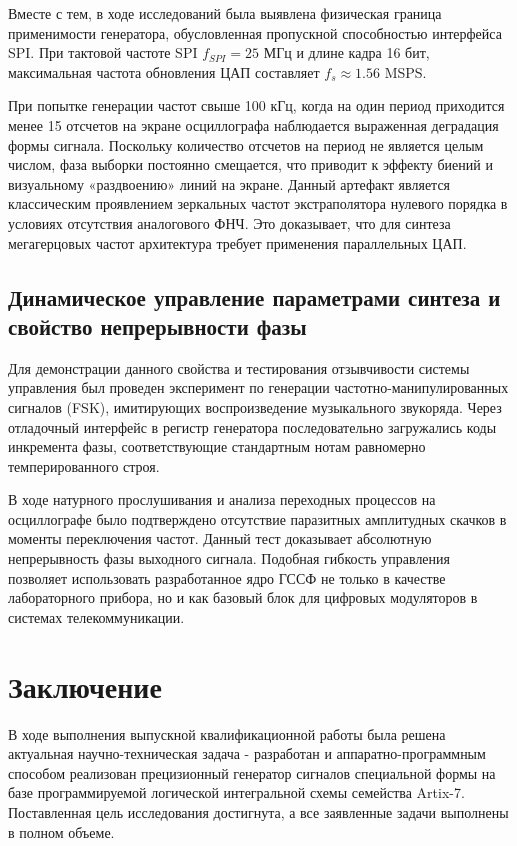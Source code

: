 \documentclass[12pt,a4paper,TimesNewRoman]{article}
\begin{document}
Вместе с тем, в ходе исследований была выявлена физическая граница применимости генератора, обусловленная пропускной способностью интерфейса SPI. При тактовой частоте SPI $f_{SPI} = 25$ МГц и длине кадра 16 бит, максимальная частота обновления ЦАП составляет $f_s \approx 1.56$ MSPS.

При попытке генерации частот свыше 100 кГц, когда на один период приходится менее 15 отсчетов на экране осциллографа наблюдается выраженная деградация формы сигнала. Поскольку количество отсчетов на период не является целым числом, фаза выборки постоянно смещается, что приводит к эффекту биений и визуальному «раздвоению» линий на экране. Данный артефакт является классическим проявлением зеркальных частот экстраполятора нулевого порядка в условиях отсутствия аналогового ФНЧ. Это доказывает, что для синтеза мегагерцовых частот архитектура требует применения параллельных ЦАП.

\subsection{Динамическое управление параметрами синтеза и свойство непрерывности фазы}

Для демонстрации данного свойства и тестирования отзывчивости системы управления был проведен эксперимент по генерации частотно-манипулированных сигналов (FSK), имитирующих воспроизведение музыкального звукоряда. Через отладочный интерфейс в регистр генератора последовательно загружались коды инкремента фазы, соответствующие стандартным нотам равномерно темперированного строя.

В ходе натурного прослушивания и анализа переходных процессов на осциллографе было подтверждено отсутствие паразитных амплитудных скачков в моменты переключения частот. Данный тест доказывает абсолютную непрерывность фазы выходного сигнала. Подобная гибкость управления позволяет использовать разработанное ядро ГССФ не только в качестве лабораторного прибора, но и как базовый блок для цифровых модуляторов в системах телекоммуникации.

\section*{Заключение}

В ходе выполнения выпускной квалификационной работы была решена актуальная научно-техническая задача - разработан и аппаратно-программным способом реализован прецизионный генератор сигналов специальной формы на базе программируемой логической интегральной схемы  семейства Artix-7. Поставленная цель исследования достигнута, а все заявленные задачи выполнены в полном объеме.
\end{document}
